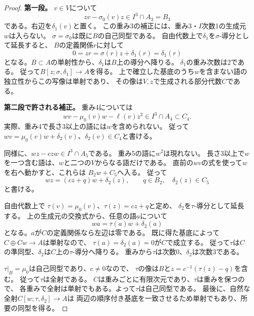 \documentclass[11pt,a4paper]{ltjsarticle}
\theoremstyle{definition}
\begin{document}
\begin{proof}
\par\smallskip\noindent\textbf{第一段。}\quad
$v\in V$について
\[
 zv-\sigma_0(v)z\in I^3\cap A_3=B_3
\]
である。右辺を$\delta_1(v)$と置く。
この重み3の補正には、重み3・$I$次数1の生成元$w$は入らない。
$\sigma=\sigma_0$は既に$B$の自己同型である。
自由代数上で$\delta_1$を$\sigma$-導分として延長すると、
$B$の定義関係$r$に対して
\[
 0=zr=\sigma(r)z+\delta_1(r)=\delta_1(r)
\]
となる。$B\subset A$の単射性から、$\delta_1$は$B$上の導分へ降りる。
$\delta_1$の重み次数は2である。
従って$B[z;\sigma,\delta_1]\to A$を得る。
上で確立した基底のうち$w$を含まない語の独立性からこの写像は単射であり、
その像は$V,z$で生成される部分代数$C$である。

\par\smallskip\noindent\textbf{第二段で許される補正。}\quad
重み4については
\[
 wv-\mu_0(v)w-\ell(v)z^2\in I^3\cap A_4\subset C_4.
\]
実際、重み4で長さ3以上の語には$w$を含められない。
従って$wv=\mu_0(v)w+\delta_2(v)$、$\delta_2(v)\in C_4$と書ける。

同様に、$wz-czw\in I^3\cap A_5$である。
重み5の語に$w^2$は現れない。
長さ3以上で$w$を一つ含む語は、$w$と二つの$V$からなる語だけである。
直前の$wv$の式を使って$w$を右へ動かすと、これらは
$B_2w+C_5$へ入る。
従って
\[
 wz=(cz+q)w+\delta_2(z),
 \qquad q\in B_2,\quad\delta_2(z)\in C_5
\]
と書ける。

自由代数上で
$\tau(v)=\mu_0(v)$、$\tau(z)=cz+q$と定め、
$\delta_2$を$\tau$-導分として延長する。
上の生成元の交換式から、任意の語$a$について
\[
 wa=\tau(a)w+\delta_2(a)
\]
となる。$a$が$C$の定義関係なら左辺は零である。
既に得た基底によって$C\oplus Cw\to A$は単射なので、
$\tau(a)=\delta_2(a)=0$が$C$で成立する。
従って$\tau$は$C$の準同型、$\delta_2$は$C$上の$\tau$-導分へ降りる。
重みから$\tau$は次数0、$\delta_2$は次数3である。

$\tau|_B=\mu_0$は自己同型であり、$c\ne0$なので、
$\tau$の像は$B$と$z=c^{-1}(\tau(z)-q)$を含む。
従って$\tau$は全射である。
$C$は重みごとに有限次元であり、$\tau$は重みを保つので、
各重みで全射は単射でもある。よって$\tau$は自己同型である。
最後に、自然な全射$C[w;\tau,\delta_2]\to A$は
両辺の順序付き基底を一致させるため単射でもあり、所要の同型を得る。
\end{proof}
\end{document}
